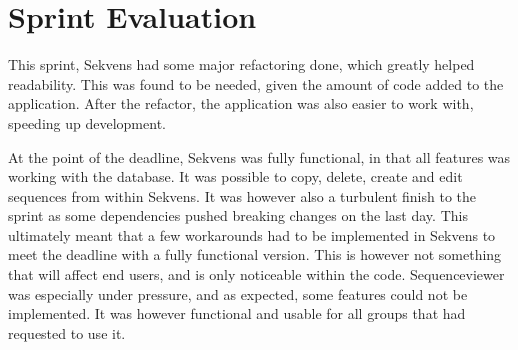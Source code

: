 \section{Sprint Evaluation}
This sprint, Sekvens had some major refactoring done, which greatly helped readability. This was found to be needed, given the amount of code added to the application. After the refactor, the application was also easier to work with, speeding up development.

At the point of the deadline, Sekvens was fully functional, in that all features was working with the database. It was possible to copy, delete, create and edit sequences from within Sekvens. It was however also a turbulent finish to the sprint as some dependencies pushed breaking changes on the last day. This ultimately meant that a few workarounds had to be implemented in Sekvens to meet the deadline with a fully functional version. This is however not something that will affect end users, and is only noticeable within the code.
Sequenceviewer was especially under pressure, and as expected, some features could not be implemented. It was however functional and usable for all groups that had requested to use it.